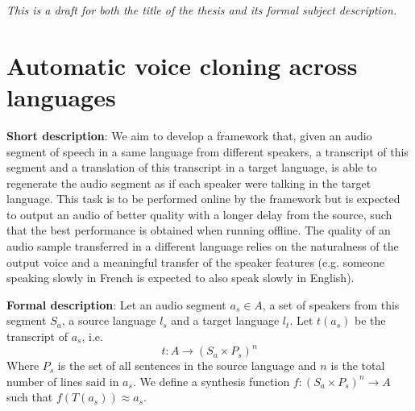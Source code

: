\documentclass[a4paper, oneside]{article}
\begin{document}
\textit{This is a draft for both the title of the thesis and its formal subject description.}
\section*{Automatic voice cloning across languages}

\textbf{Short description}: We aim to develop a framework that, given an audio segment of speech in a same language from different speakers, a transcript of this segment and a translation of this transcript in a target language, is able to regenerate the audio segment as if each speaker were talking in the target language. This task is to be performed online by the framework but is expected to output an audio of better quality with a longer delay from the source, such that the best performance is obtained when running offline. The quality of an audio sample transferred in a different language relies on the naturalness of the output voice and a meaningful transfer of the speaker features (e.g. someone speaking slowly in French is expected to also speak slowly in English).

\vspace{0.7cm}
\textbf{Formal description}: Let an audio segment $a_s \in A$, a set of speakers from this segment $S_a$, a source language $l_s$ and a target language $l_t$. Let $t(a_s)$ be the transcript of $a_s$, i.e. 
$$t: A \rightarrow (S_a \times P_s)^n$$
Where $P_s$ is the set of all sentences in the source language and $n$ is the total number of lines said in $a_s$. We define a synthesis function $f: (S_a \times P_s)^n \rightarrow A$ such that $f(T(a_s)) \approx a_s$.


\clearpage
\end{document}
